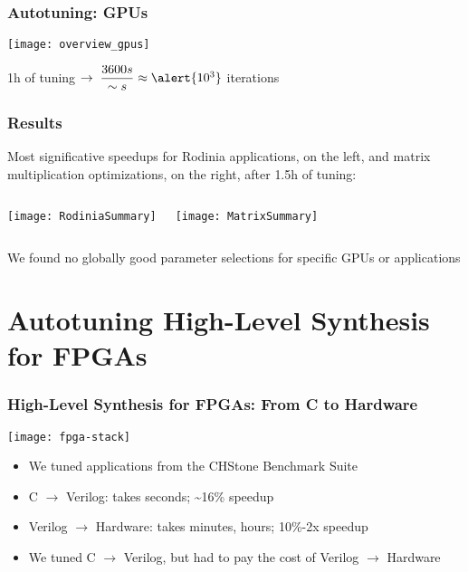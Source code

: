 \documentclass[10pt, compress, aspectratio=169, xcolor=table]{beamer}
\begin{document}
\begin{frame}
    \frametitle{Autotuning: GPUs}
    \begin{center}
        \texttt{[image: overview\_gpus]}

        \alert{1h} of tuning $\rightarrow \; \dfrac{3600s}{\sim{}s} \approx \alert{10^3}$ \alert{iterations}
    \end{center}
\end{frame}

\begin{frame}
    \frametitle{Results}
    \alert{Most significative speedups} for \alert{Rodinia applications}, on the left,
    and \alert{matrix multiplication optimizations}, on the right, after \alert{1.5h of tuning}:
    \begin{columns}[T,onlytextwidth]
        \vspace{0.57cm}
        \begin{center}
            \texttt{[image: RodiniaSummary]}
        \end{center}

        \begin{center}
            \texttt{[image: MatrixSummary]}
        \end{center}

    \end{columns}
    We \alert{found no globally good parameter selections} for specific GPUs or applications
\end{frame}

\section{Autotuning High-Level Synthesis for FPGAs}

\begin{frame}
    \frametitle{High-Level Synthesis for FPGAs: From C to Hardware}
    \begin{center}
        \texttt{[image: fpga-stack]}
    \end{center}

    \begin{itemize}
        \item We tuned applications from the \alert{CHStone Benchmark Suite}
        \item C $\rightarrow$ Verilog: takes \alert{seconds}; \alert{\textasciitilde16\% speedup}
        \item Verilog $\rightarrow$ Hardware: takes \alert{minutes}, \alert{hours}; \alert{10\%-2x speedup}
        \item We tuned C $\rightarrow$ Verilog, but had \alert{to pay the cost} of Verilog $\rightarrow$ Hardware
    \end{itemize}
\end{frame}
\end{document}
